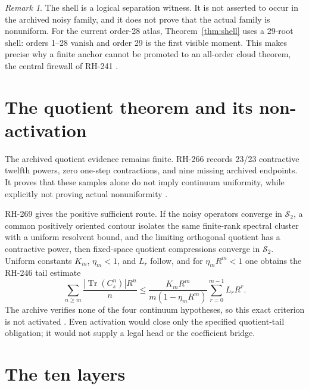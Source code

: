 \documentclass[11pt]{article}
\theoremstyle{remark}
\newtheorem{remark}[theorem]{Remark}
\newcommand{\Tr}{\operatorname{Tr}}
\begin{document}
\begin{remark}
The shell is a logical separation witness.  It is not asserted to occur in
the archived noisy family, and it does not prove that the actual family is
nonuniform.  For the current order-28 atlas, Theorem~\ref{thm:shell} uses a
29-root shell: orders 1--28 vanish and order 29 is the first visible moment.
This makes precise why a finite anchor cannot be promoted to an all-order
cloud theorem, the central firewall of RH-241 \citep{WangRH241}.
\end{remark}

\section{The quotient theorem and its non-activation}

The archived quotient evidence remains finite.  RH-266 records 23/23
contractive twelfth powers, zero one-step contractions, and nine missing
archived endpoints.  It proves that these samples alone do not imply
continuum uniformity, while explicitly not proving actual nonuniformity
\citep{WangRH266}.

RH-269 gives the positive sufficient route.  If the noisy operators converge
in $\mathcal S_2$, a common positively oriented contour isolates the same
finite-rank spectral cluster with a uniform resolvent bound, and the limiting
orthogonal quotient has a contractive power, then fixed-space quotient
compressions converge in $\mathcal S_2$.  Uniform constants
$K_m$, $\eta_m<1$, and $L_r$ follow, and for $\eta_mR^m<1$ one obtains the
RH-246 tail estimate
\begin{equation}
 \sum_{n\ge m}\frac{|\Tr(C_s^n)|R^n}{n}
 \le
 \frac{K_mR^m}{m(1-\eta_mR^m)}
 \sum_{r=0}^{m-1}L_rR^r.
 \label{eq:quotienttail}
\end{equation}
The archive verifies none of the four continuum hypotheses, so this exact
criterion is not activated \citep{WangRH246,WangRH269}.  Even activation
would close only the specified quotient-tail obligation; it would not supply
a legal head or the coefficient bridge.

\section{The ten layers}
\end{document}
